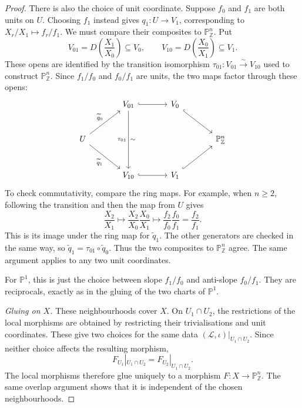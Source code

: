 \documentclass{article}
\theoremstyle{definition}
\theoremstyle{remark}
\theoremstyle{plain}
\newcommand{\Z}{\mathbb{Z}}
\renewcommand{\P}{\mathbb{P}}
\begin{document}
\begin{proof}
    There is also the choice of unit coordinate. Suppose \(f_0\) and
    \(f_1\) are both units on \(U\). Choosing \(f_1\) instead gives
    \(q_1:U\to V_1\), corresponding to
    \(X_r/X_1\mapsto f_r/f_1\). We must compare their composites to
    \(\P^n_\Z\). Put
    \[
        V_{01}=D\left(\frac{X_1}{X_0}\right)\subseteq V_0,
        \qquad
        V_{10}=D\left(\frac{X_0}{X_1}\right)\subseteq V_1.
    \]
    These opens are identified by the transition isomorphism
    \(\tau_{01}:V_{01}\xrightarrow{\sim}V_{10}\) used to construct
    \(\P^n_\Z\). Since \(f_1/f_0\) and \(f_0/f_1\) are units, the two
    maps factor through these opens:
    \[
    \begin{tikzcd}[column sep=large,row sep=large]
        & V_{01}
            \arrow[r,hook]
            \arrow[dd,"\tau_{01}"',"\sim"]
        & V_0 \arrow[dr,hook] & \\
        U \arrow[ur,"\widetilde q_0"]
          \arrow[dr,"\widetilde q_1"']
        & & & \P^n_\Z \\
        & V_{10} \arrow[r,hook]
        & V_1 \arrow[ur,hook] &
    \end{tikzcd}
    \]
    To check commutativity, compare the ring maps. For example, when
    \(n\ge2\), following the transition and then the map from \(U\) gives
    \[
        \frac{X_2}{X_1}
        \longmapsto\frac{X_2}{X_0}\frac{X_0}{X_1}
        \longmapsto\frac{f_2}{f_0}\frac{f_0}{f_1}
        =\frac{f_2}{f_1}.
    \]
    This is its image under the ring map for \(\widetilde q_1\).
    The other generators are checked in the same way, so
    \(\widetilde q_1=\tau_{01}\circ\widetilde q_0\).
    Thus the two composites to \(\P^n_\Z\) agree. The same argument
    applies to any two unit coordinates.

    For \(\P^1\), this is just the choice between slope \(f_1/f_0\)
    and anti-slope \(f_0/f_1\). They are reciprocals, exactly as in
    the gluing of the two charts of \(\P^1\).

    \emph{Gluing on \(X\).}
    These neighbourhoods cover \(X\). On \(U_1\cap U_2\), the restrictions
    of the local morphisms are obtained by restricting their
    trivialisations and unit coordinates. These give two choices for
    the same data \((\mathcal{L},\iota)|_{U_1\cap U_2}\). Since neither
    choice affects the resulting morphism,
    \[
        F_{U_1}|_{U_1\cap U_2}=F_{U_2}|_{U_1\cap U_2}.
    \]
    The local morphisms therefore glue uniquely to a morphism
    \(F:X\to\P^n_\Z\). The same overlap argument shows that it is
    independent of the chosen neighbourhoods.
\end{proof}
\end{document}

